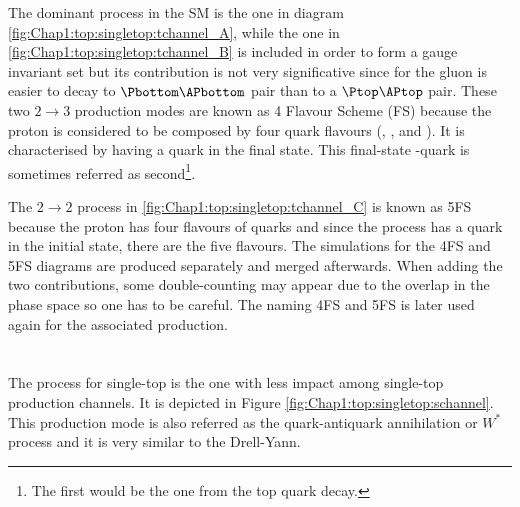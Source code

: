 The dominant process in the SM is the one in diagram \ref{fig:Chap1:top:singletop:tchannel_A}, while 
the one in \ref{fig:Chap1:top:singletop:tchannel_B} is included in order to form a gauge invariant set 
but its contribution is not very significative since for the gluon is easier to decay to $\Pbottom\APbottom$ 
pair than to a $\Ptop\APtop$ pair. These two $2 \rightarrow 3$ production modes are known 
as 4 Flavour Scheme (FS) because the proton is considered to be composed
by four quark flavours (\Pup, \Pdown, \Pcharm and \Pstrange). It is characterised by having a \Pbottom 
quark in the final state. This final-state \Pbottom-quark is sometimes referred as second\footnote{The 
first would be the one from the top quark decay.}.%


The $2 \rightarrow 2$ process in \ref{fig:Chap1:top:singletop:tchannel_C} is known as 
5FS because the proton has 
four flavours of quarks and since the process has a \Pbottom quark in the initial state, there are the five flavours.
The simulations for the 4FS and 5FS diagrams are produced separately and
merged afterwards. When adding the two contributions, some double-counting may appear due to the overlap in the phase space so one has to be careful. The naming 4FS and 5FS is later used again for the associated \tH production.


\paragraph{\schannel}\mbox{}\\
The \schannel process for single-top is the one with less impact among single-top production channels.  
It is depicted in Figure \ref{fig:Chap1:top:singletop:schannel}. 
This production mode is also referred as the quark-antiquark annihilation or $W^{*}$ process  and it is very similar
to the Drell-Yann. 

